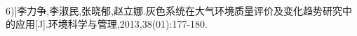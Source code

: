\documentclass[preview]{standalone}
\begin{document}
\begin{center}
\quad\\6)]李力争,李淑民,张晓郁,赵立娜.灰色系统在大气环境质量评价及变化趋势研究中的应用[J].环境科学与管理,2013,38(01):177-180.\quad\\
\end{center}
\end{document}
